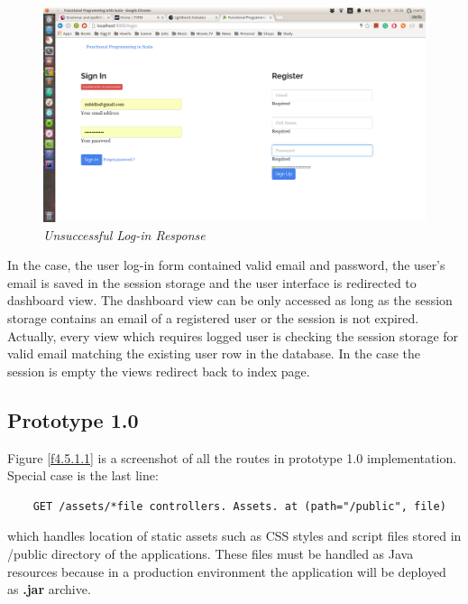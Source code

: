 \documentclass[12pt,twoside,a4paper]{report}
\begin{document}
\begin{figure}[!ht]
	\centering
		\includegraphics[width=1\textwidth, totalheight=8cm]
		{invalid_user_or_password_view}
	\caption{\textit{Unsuccessful Log-in Response}}
	\label{f4.5.1}
\end{figure}

In the case, the user log-in form contained valid email and password, the user's email is saved in the session storage and the user interface is redirected to dashboard view. The dashboard view can be only accessed as long as the session storage contains an email of a registered user or the session is not expired. Actually, every view which requires logged user is checking the session storage for valid email matching the existing user row in the database. In the case the session is empty the views redirect back to index page.

\subsection{Prototype 1.0}\label{4.5.1}

Figure \ref{f4.5.1.1} is a screenshot of all the routes in prototype 1.0 implementation. Special case is the last line:
\begin{lstlisting} 
	GET /assets/*file controllers. Assets. at (path="/public", file)
\end{lstlisting} 
which handles location of static assets such as CSS styles and script files stored in /public directory of the applications. These files must be handled as Java resources because in a production environment the application will be deployed as \textbf{.jar} archive.
\end{document}

